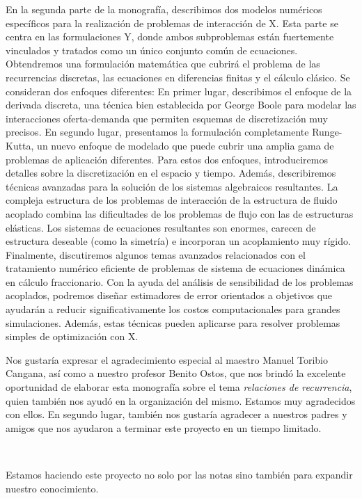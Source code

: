 En la segunda parte de la monografía, describimos dos modelos numéricos específicos para la realización de problemas de interacción de X. Esta parte se centra en las formulaciones Y, donde ambos subproblemas están fuertemente vinculados y tratados como un único conjunto común de ecuaciones. Obtendremos una formulación matemática que cubrirá el problema de las recurrencias discretas, las ecuaciones en diferencias finitas y el cálculo clásico. Se consideran dos enfoques diferentes: En primer lugar, describimos el enfoque de la derivada discreta, una técnica bien establecida por George Boole para modelar las interacciones oferta-demanda que permiten esquemas de discretización muy precisos. En segundo lugar, presentamos la formulación completamente Runge-Kutta, un nuevo enfoque de modelado que puede cubrir una amplia gama de problemas de aplicación diferentes. Para estos dos enfoques, introduciremos detalles sobre la discretización en el espacio y tiempo. Además, describiremos técnicas avanzadas para la solución de los sistemas algebraicos resultantes. La compleja estructura de los problemas de interacción de la estructura de fluido acoplado combina las dificultades de los problemas de flujo con las de estructuras elásticas. Los sistemas de ecuaciones resultantes son enormes, carecen de estructura deseable (como la simetría) e incorporan un acoplamiento muy rígido. Finalmente, discutiremos algunos temas avanzados relacionados con el tratamiento numérico eficiente de problemas de sistema de ecuaciones dinámica en cálculo fraccionario. Con la ayuda del análisis de sensibilidad de los problemas acoplados, podremos diseñar estimadores de error orientados a objetivos que ayudarán a reducir significativamente los costos computacionales para grandes simulaciones. Además, estas técnicas pueden aplicarse para resolver problemas simples de optimización con X.

\begin{acknowledgement}
Nos gustaría expresar el agradecimiento especial al maestro Manuel Toribio Cangana, así como a nuestro profesor Benito Ostos, que nos brindó la excelente oportunidad de elaborar esta monografía sobre el tema \emph{relaciones de recurrencia}, quien también nos ayudó en la organización del mismo. Estamos muy agradecidos con ellos. En segundo lugar, también nos gustaría agradecer a nuestros padres y amigos que nos ayudaron a terminar este proyecto en un tiempo limitado.\par

\

Estamos haciendo este proyecto no solo por las notas sino también para expandir nuestro conocimiento.
\end{acknowledgement}